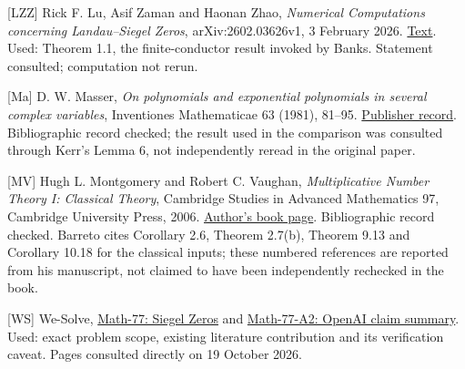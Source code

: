 \documentclass[11pt]{article}
\begin{document}
{[}LZZ{]} Rick F. Lu, Asif Zaman and Haonan Zhao, \emph{Numerical Computations concerning Landau--Siegel Zeros}, arXiv:2602.03626v1, 3 February 2026. \href{https://arxiv.org/html/2602.03626v1}{Text}. Used: Theorem 1.1, the finite-conductor result invoked by Banks. Statement consulted; computation not rerun.

{[}Ma{]} D. W. Masser, \emph{On polynomials and exponential polynomials in several complex variables}, Inventiones Mathematicae 63 (1981), 81--95. \href{https://link.springer.com/article/10.1007/BF01389194}{Publisher record}. Bibliographic record checked; the result used in the comparison was consulted through Kerr's Lemma 6, not independently reread in the original paper.

{[}MV{]} Hugh L. Montgomery and Robert C. Vaughan, \emph{Multiplicative Number Theory I: Classical Theory}, Cambridge Studies in Advanced Mathematics 97, Cambridge University Press, 2006. \href{https://www-personal.umich.edu/~hlm/mnt1.html}{Author's book page}. Bibliographic record checked. Barreto cites Corollary 2.6, Theorem 2.7(b), Theorem 9.13 and Corollary 10.18 for the classical inputs; these numbered references are reported from his manuscript, not claimed to have been independently rechecked in the book.

{[}WS{]} We-Solve, \href{https://we-solve.github.io/problems/siegel-zeros/}{Math-77: Siegel Zeros} and \href{https://we-solve.github.io/contributions/siegel-zeros/attempt-2/r1/}{Math-77-A2: OpenAI claim summary}. Used: exact problem scope, existing literature contribution and its verification caveat. Pages consulted directly on 19 October 2026.
\end{document}

